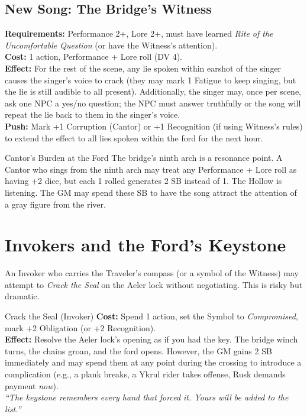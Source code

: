 \documentclass[10pt,twoside]{book}
\begin{document}
\subsection*{New Song: The Bridge's Witness}

\textbf{Requirements:} Performance 2+, Lore 2+, must have learned \textit{Rite of the Uncomfortable Question} (or have the Witness's attention). \\
\textbf{Cost:} 1 action, Performance + Lore roll (DV 4). \\
\textbf{Effect:} For the rest of the scene, any lie spoken within earshot of the singer causes the singer's voice to crack (they may mark 1 Fatigue to keep singing, but the lie is still audible to all present). Additionally, the singer may, once per scene, ask one NPC a yes/no question; the NPC must answer truthfully or the song will repeat the lie back to them in the singer's voice. \\
\textbf{Push:} Mark +1 Corruption (Cantor) or +1 Recognition (if using Witness's rules) to extend the effect to all lies spoken within the ford for the next hour.

\begin{adventurebox}{Cantor's Burden at the Ford}
The bridge's ninth arch is a resonance point. A Cantor who sings from the ninth arch may treat any Performance + Lore roll as having +2 dice, but each 1 rolled generates 2 SB instead of 1. The Hollow is listening. The GM may spend these SB to have the song attract the attention of a gray figure from the river.
\end{adventurebox}

\section*{Invokers and the Ford's Keystone}

An Invoker who carries the Traveler's compass (or a symbol of the Witness) may attempt to \textit{Crack the Seal} on the Aeler lock without negotiating. This is risky but dramatic.

\begin{adventurebox}{Crack the Seal (Invoker)}
\textbf{Cost:} Spend 1 action, set the Symbol to \textit{Compromised}, mark +2 Obligation (or +2 Recognition). \\
\textbf{Effect:} Resolve the Aeler lock's opening as if you had the key. The bridge winch turns, the chains groan, and the ford opens. However, the GM gains 2 SB immediately and may spend them at any point during the crossing to introduce a complication (e.g., a plank breaks, a Ykrul rider takes offense, Rusk demands payment \textit{now}). \\
\textit{``The keystone remembers every hand that forced it. Yours will be added to the list.''}
\end{adventurebox}
\end{document}
